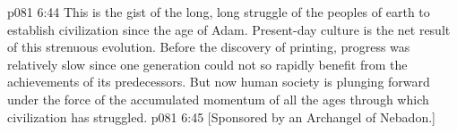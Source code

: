 \vs p081 6:44 \pc This is the gist of the long, long struggle of the peoples of earth to establish civilization since the age of Adam. Present\hyp{}day culture is the net result of this strenuous evolution. Before the discovery of printing, progress was relatively slow since one generation could not so rapidly benefit from the achievements of its predecessors. But now human society is plunging forward under the force of the accumulated momentum of all the ages through which civilization has struggled.
\vsetoff
\vs p081 6:45 [Sponsored by an Archangel of Nebadon.]
\quizlink
{}
